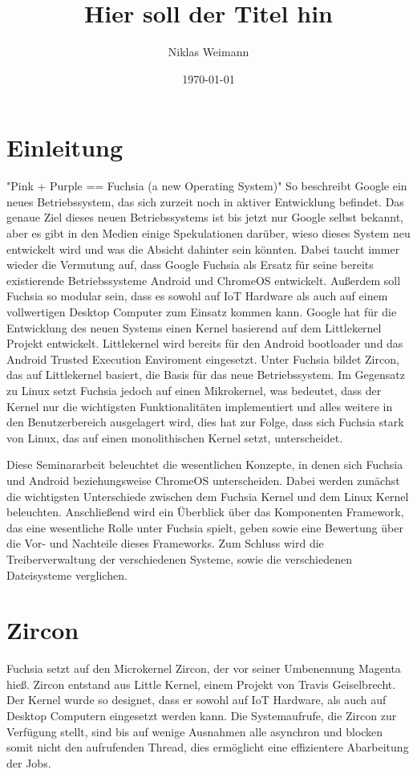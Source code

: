 \documentclass[a4paper]{scrartcl}
\begin{document}
\title{Hier soll der Titel hin}
\author{Niklas Weimann}
\date{\today}

\maketitle


\tableofcontents
\newpage



\section{Einleitung}
"Pink + Purple == Fuchsia (a new Operating System)"\cite{GoogleLLC.} So beschreibt Google ein neues Betriebssystem, das sich zurzeit noch in aktiver Entwicklung befindet. Das genaue Ziel dieses neuen Betriebssystems ist bis jetzt nur Google selbst bekannt, aber es gibt in den Medien einige Spekulationen darüber, wieso dieses System neu entwickelt wird und was die Absicht dahinter sein könnten. Dabei taucht immer wieder die Vermutung auf, dass Google Fuchsia als Ersatz für seine bereits existierende Betriebssysteme Android und ChromeOS entwickelt. Außerdem soll Fuchsia so modular sein, dass es sowohl auf IoT Hardware als auch auf einem vollwertigen Desktop Computer zum Einsatz kommen kann. Google hat für die Entwicklung des neuen Systems einen Kernel basierend auf dem Littlekernel Projekt entwickelt. Littlekernel wird bereits für den Android bootloader und das Android Trusted Execution Enviroment eingesetzt. Unter Fuchsia bildet Zircon, das auf Littlekernel basiert, die Basis für das neue Betriebssystem. Im Gegensatz zu Linux setzt Fuchsia jedoch auf einen Mikrokernel, was bedeutet, dass der Kernel nur die wichtigsten Funktionalitäten implementiert und alles weitere in den Benutzerbereich ausgelagert wird, dies hat zur Folge, dass sich Fuchsia stark von Linux, das auf einen monolithischen Kernel setzt, unterscheidet.

Diese Seminararbeit beleuchtet die wesentlichen Konzepte, in denen sich Fuchsia und Android beziehungsweise ChromeOS unterscheiden. Dabei werden zunächst die wichtigsten Unterschiede zwischen dem Fuchsia Kernel und dem Linux Kernel beleuchten. Anschließend wird ein Überblick über das Komponenten Framework, das eine wesentliche Rolle unter Fuchsia spielt, geben sowie eine Bewertung über die Vor- und Nachteile dieses Frameworks. Zum Schluss wird die Treiberverwaltung der verschiedenen Systeme, sowie die verschiedenen Dateisysteme verglichen.
\section{Zircon}
Fuchsia setzt auf den Microkernel Zircon, der vor seiner Umbenennung Magenta hieß. Zircon entstand aus Little Kernel, einem Projekt von Travis Geiselbrecht. Der Kernel wurde so designet, dass er sowohl auf IoT Hardware, als auch auf Desktop Computern eingesetzt werden kann. \cite{DaveAltavilla.30.Juni2019} Die Systemaufrufe, die Zircon zur Verfügung stellt, sind bis auf wenige Ausnahmen alle asynchron und blocken somit nicht den aufrufenden Thread, dies ermöglicht eine effizientere Abarbeitung der Jobs.
\end{document}
